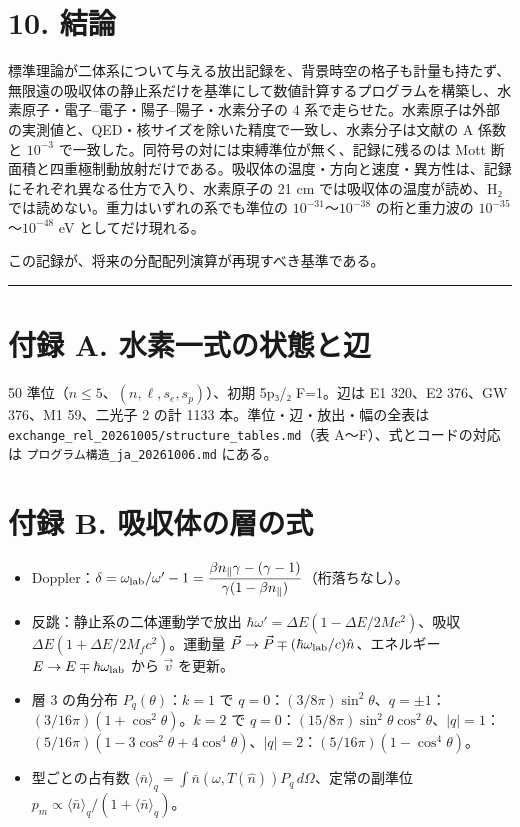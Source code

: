 \documentclass[
  a4paper,
]{ltjsarticle}
\providecommand{\tightlist}{%
  \setlength{\itemsep}{0pt}\setlength{\parskip}{0pt}}
\begin{document}
\section{10. 結論}\label{ux7d50ux8ad6}

標準理論が二体系について与える放出記録を、背景時空の格子も計量も持たず、無限遠の吸収体の静止系だけを基準にして数値計算するプログラムを構築し、水素原子・電子--電子・陽子--陽子・水素分子の
4
系で走らせた。水素原子は外部の実測値と、QED・核サイズを除いた精度で一致し、水素分子は文献の
A 係数と \(10^{-3}\)
で一致した。同符号の対には束縛準位が無く、記録に残るのは Mott
断面積と四重極制動放射だけである。吸収体の温度・方向と速度・異方性は、記録にそれぞれ異なる仕方で入り、水素原子の
21 cm では吸収体の温度が読め、H₂
では読めない。重力はいずれの系でも準位の \(10^{-31}\)〜\(10^{-38}\)
の桁と重力波の \(10^{-35}\)〜\(10^{-48}\) eV としてだけ現れる。

この記録が、将来の分配配列演算が再現すべき基準である。

\begin{center}\rule{0.5\linewidth}{0.5pt}\end{center}

\section{付録 A.
水素一式の状態と辺}\label{ux4ed8ux9332-a.-ux6c34ux7d20ux4e00ux5f0fux306eux72b6ux614bux3068ux8fba}

50 準位（\(n\le5\)、\((n,\ell,s_e,s_p)\)）、初期 5p₃/₂ F=1。辺は E1
320、E2 376、GW 376、M1 59、二光子 2 の計 1133
本。準位・辺・放出・幅の全表は
\texttt{exchange\_rel\_20261005/structure\_tables.md}（表
A〜F）、式とコードの対応は \texttt{プログラム構造\_ja\_20261006.md}
にある。

\section{付録 B.
吸収体の層の式}\label{ux4ed8ux9332-b.-ux5438ux53ceux4f53ux306eux5c64ux306eux5f0f}

\begin{itemize}
\tightlist
\item
  Doppler：\(\delta=\omega_{\rm lab}/\omega'-1=\dfrac{\beta n_\parallel\gamma-(\gamma-1)}{\gamma(1-\beta n_\parallel)}\)（桁落ちなし）。
\item
  反跳：静止系の二体運動学で放出
  \(\hbar\omega'=\Delta E(1-\Delta E/2Mc^2)\)、吸収
  \(\Delta E(1+\Delta E/2M_fc^2)\)。運動量
  \(\vec P\to\vec P\mp(\hbar\omega_{\rm lab}/c)\hat n\)、エネルギー
  \(E\to E\mp\hbar\omega_{\rm lab}\) から \(\vec v\) を更新。
\item
  層 3 の角分布 \(P_q(\theta)\)：\(k=1\) で
  \(q=0\)：\((3/8\pi)\sin^2\theta\)、\(q=\pm1\)：\((3/16\pi)(1+\cos^2\theta)\)。\(k=2\)
  で
  \(q=0\)：\((15/8\pi)\sin^2\theta\cos^2\theta\)、\(|q|=1\)：\((5/16\pi)(1-3\cos^2\theta+4\cos^4\theta)\)、\(|q|=2\)：\((5/16\pi)(1-\cos^4\theta)\)。
\item
  型ごとの占有数
  \(\langle\bar n\rangle_q=\int\bar n(\omega,T(\hat n))P_q\,d\Omega\)、定常の副準位
  \(p_m\propto\langle\bar n\rangle_q/(1+\langle\bar n\rangle_q)\)。
\end{itemize}
\end{document}
